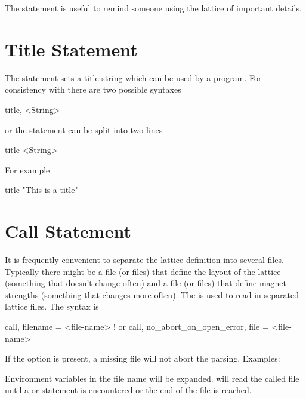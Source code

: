 {{{{{The  statement is useful to remind someone using the lattice of important details.

\section{Title Statement}

The  statement sets a title string which can be used by a program.  For consistency with
\mad there are two possible syntaxes
\begin{example}
  title, <String>
\end{example}
or the statement can be split into two lines
\begin{example}
  title
  <String>
\end{example}
For example
\begin{example}
  title
  "This is a title"
\end{example}

\section{Call Statement}
\label{s:call}

It is frequently convenient to separate the lattice definition into several files.  Typically there
might be a file (or files) that define the layout of the lattice (something that doesn't change
often) and a file (or files) that define magnet strengths (something that changes more often).  The
 is used to read in separated lattice files. The syntax is
\begin{example}
  call, filename = <file-name>   ! or
  call, no_abort_on_open_error, file = <file-name>
\end{example}
If the  option is present, a missing file will not abort the parsing.
Examples:
Environment variables in the file name will be expanded. \bmad will read the called file until a
 or  statement is encountered or the end of the file is reached.

}}}}}

